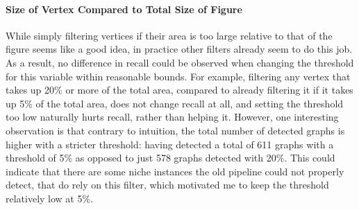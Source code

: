 \documentclass[practical,english]{info1thesis}
\begin{document}
\paragraph{Size of Vertex Compared to Total Size of Figure}
While simply filtering vertices if their area is too large relative to that of the figure seems like a good idea, in practice other filters already seem to do this job.
As a result, no difference in recall could be observed when changing the threshold for this variable within reasonable bounds. 
For example, filtering any vertex that takes up 20\% or more of the total area, compared to already filtering it if it takes up 5\% of the total area, does not change recall at all, and setting the threshold too low naturally hurts recall, rather than helping it.
However, one interesting observation is that contrary to intuition, the total number of detected graphs is higher with a stricter threshold: having detected a total of 611 graphs with a threshold of 5\% as opposed to just 578 graphs detected with 20\%.
This could indicate that there are some niche instances the old pipeline could not properly detect, that do rely on this filter, which motivated me to keep the threshold relatively low at 5\%.
\end{document}
